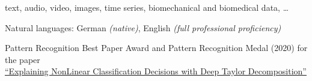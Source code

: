 \documentclass[10pt,a4paper]{article} %
\begin{document}
\vspace{5pt}
{
       text, audio, video, images, time series, biomechanical and biomedical data, \dots
}



\vspace{5pt}
\inlineheadsection %
{Natural languages:}
{
    German \textit{(native)}, English \textit{(full professional proficiency)}
}


\spacedhrule{1.6em}{-0.4em} %









\inlineheadsection
{Pattern Recognition Best Paper Award and Pattern Recognition Medal (2020)}
{
    for the paper\\
    \href{https://doi.org/10.1016/j.patcog.2016.11.008}{\qquad ``Explaining NonLinear Classification Decisions with Deep Taylor Decomposition''}
}
\end{document}
